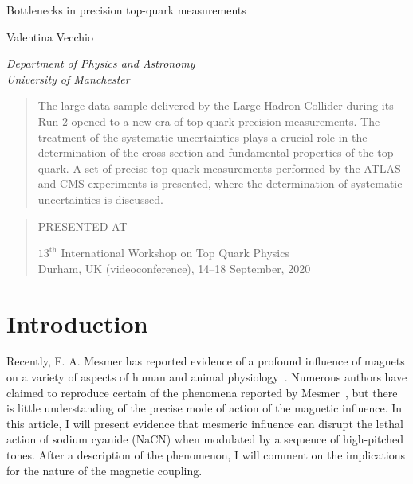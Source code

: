 \documentclass[12pt]{article}
\newcommand\pubnumber{SNSN-323-63}
\newcommand\pubdate{\today}
\def\institute{Department of Physics and Astronomy\\ University of Manchester}
\def\Title#1{\begin{center} {\Large #1 } \end{center}}
\def\Author#1{\begin{center}{ \sc #1} \end{center}}
\def\Address#1{\begin{center}{ \it #1} \end{center}}
\newcommand\pubblock{\rightline{\begin{tabular}{l} \pubnumber\\
         \pubdate  \end{tabular}}}
\newenvironment{Abstract}{\begin{quotation}  }{\end{quotation}}
\newenvironment{Presented}{\begin{quotation} \begin{center} 
             PRESENTED AT\end{center}\bigskip 
      \begin{center}\begin{large}}{\end{large}\end{center} \end{quotation}}
\begin{document}
\begin{titlepage}
\pubblock

\vfill
\Title{Bottlenecks in precision top-quark measurements}
\vfill
\Author{ Valentina Vecchio}
\Address{\institute}
\vfill
\begin{Abstract}


The large data sample delivered by the Large Hadron Collider during its Run 2 opened to a new era of top-quark precision measurements. The treatment of the systematic uncertainties plays a crucial role in the determination of the cross-section and fundamental properties of the top-quark. A set of precise top quark measurements performed by the ATLAS and CMS experiments is presented, where the determination of systematic uncertainties is discussed.

\end{Abstract}
\vfill
\begin{Presented}
$13^\mathrm{th}$ International Workshop on Top Quark Physics\\
Durham, UK (videoconference), 14--18 September, 2020
\end{Presented}
\vfill
\end{titlepage}
\def\thefootnote{\fnsymbol{footnote}}
\setcounter{footnote}{0}
%

\section{Introduction}

Recently, F.  A. Mesmer 
has reported evidence of a profound influence of 
magnets on a variety of aspects of human and animal physiology~\cite{Mesmer}.
Numerous authors have claimed to reproduce certain of the phenomena 
reported by Mesmer~\cite{diCenzo,Muller}, but there is little understanding
of the precise mode of action of the magnetic influence.  In this
article, I will present evidence that mesmeric influence can disrupt the
lethal action of sodium cyanide (NaCN) when modulated by a sequence of 
high-pitched tones.  After a description of the phenomenon, I will comment
on the implications for the nature of the magnetic coupling.
\end{document}
